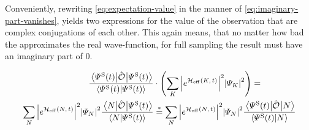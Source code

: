 Conveniently, rewriting \autoref{eq:expectation-value} in the manner of \autoref{eq:imaginary-part-vanishes}, yields two expressions for the value of the observation that are complex conjugations of each other.
This again means, that no matter how \glqq bad\grqq{} the \psiOfT[\schroedingerPicture] approximates the real wave-function, for full sampling the result must have an imaginary part of 0.

\begin{equation}
    \label{eq:imaginary-part-vanishes}
    \begin{split}
        \frac{\bracketHelper{\psiOfT[\schroedingerPicture]}{\ObservableOp}{\psiOfT[\schroedingerPicture]}}{\braketHelper{\psiOfT[\schroedingerPicture]}{\psiOfT[\schroedingerPicture]}}
        &\cdot
        \left(
            \lsum[K] \absSquare{e^{\HeffOft[K]}} \absSquare{\psiN[K]} 
        \right) =\\
        \lsum[N]
        \absSquare{e^{\HeffOft}} \absSquare{\psiN} 
        \frac{\bracketHelper{N}{\ObservableOp}{\psiOfT[\schroedingerPicture]}}{\braketHelper{N}{\psiOfT[\schroedingerPicture]}}
        &\stackrel{\ast}{=}
        \lsum[N]
        \absSquare{e^{\HeffOft}} \absSquare{\psiN} 
        \frac{\bracketHelper{\psiOfT[\schroedingerPicture]}{\ObservableOp}{N}}{\braketHelper{\psiOfT[\schroedingerPicture]}{N}}
    \end{split}
\end{equation}